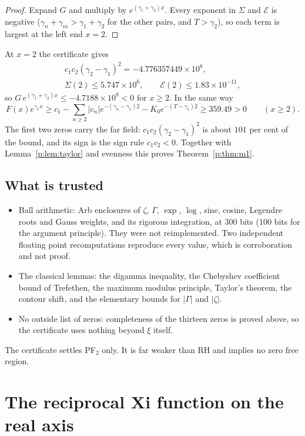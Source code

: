 \begin{proof}
Expand $G$ and multiply by $e^{(\gamma_1+\gamma_2)x}$. Every exponent in $\Sigma$ and $\mathcal E$ is negative ($\gamma_n+\gamma_m>\gamma_1+\gamma_2$ for the other pairs, and $T>\gamma_2$), so each term is largest at the left end $x=2$.
\end{proof}

At $x=2$ the certificate gives
\begin{multline*}
c_1c_2(\gamma_2-\gamma_1)^2=-4.776357449\times10^{8},\\\Sigma(2)\le5.747\times10^{6},\qquad\mathcal E(2)\le1.83\times10^{-11},
\end{multline*}
so $G\,e^{(\gamma_1+\gamma_2)x}\le-4.7188\times10^8<0$ for $x\ge2$. In the same way
\[
F(x)e^{\gamma_1x}\ge c_1-\sum_{n\ge2}|c_n|e^{-(\gamma_n-\gamma_1)2}-K_0e^{-(T-\gamma_1)2}\ge359.49>0\qquad(x\ge2).
\]
The first two zeros carry the far field: $c_1c_2(\gamma_2-\gamma_1)^2$ is about $101$ per cent of the bound, and its sign is the sign rule $c_1c_2<0$. Together with Lemma~\ref{p:lem:taylor} and evenness this proves Theorem~\ref{p:thm:m1}.

\subsection{What is trusted}

\begin{itemize}
\item Ball arithmetic: Arb \cite{Arb} enclosures of $\zeta$, $\Gamma$, $\exp$, $\log$, sine, cosine, Legendre roots and Gauss weights, and its rigorous integration, at $300$ bits ($100$ bits for the argument principle). They were not reimplemented. Two independent floating point recomputations reproduce every value, which is corroboration and not proof.
\item The classical lemmas: the digamma inequality, the Chebyshev coefficient bound of Trefethen, the maximum modulus principle, Taylor's theorem, the contour shift, and the elementary bounds for $|\Gamma|$ and $|\zeta|$.
\item No outside list of zeros: completeness of the thirteen zeros is proved above, so the certificate uses nothing beyond $\xi$ itself.
\end{itemize}
The certificate settles PF$_2$ only. It is far weaker than RH and implies no zero free region.

\section{The reciprocal Xi function on the real axis}\label{p:sec:pd}

